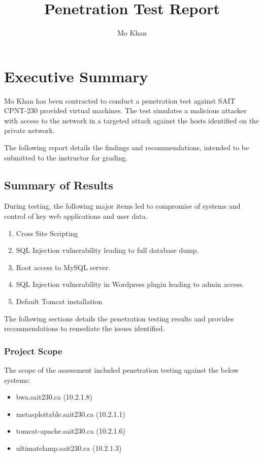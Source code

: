 \documentclass{article}
\title{Penetration Test Report}
\author{Mo Khan}
\begin{document}
\maketitle
\newpage
\tableofcontents
\newpage
{}

\section{Executive Summary}

Mo Khan has been contracted to conduct a penetration test against SAIT CPNT-230 provided
virtual machines. The test simulates a malicious attacker with access to the
network in a targeted attack against the hosts identified on the private network.

The following report details the findings and recommendations, intended to be submitted
to the instructor for grading.

\subsection{Summary of Results}

During testing, the following major items led to compromise of systems and control
of key web applications and user data.

\begin{enumerate}
  \item Cross Site Scripting
  \item SQL Injection vulnerability leading to full database dump.
  \item Root access to MySQL server.
  \item SQL Injection vulnerability in Wordpress plugin leading to admin access.
  \item Default Tomcat installation
\end{enumerate}

The following sections details the penetration testing results and provides 
recommendations to remediate the issues identified.

\subsubsection{Project Scope}

The scope of the assessment included penetration testing against the below systems:

\begin{itemize}
  \item bwa.sait230.ca (10.2.1.8)
  \item metasploitable.sait230.ca (10.2.1.1)
  \item tomcat-apache.sait230.ca (10.2.1.6)
  \item ultimatelamp.sait230.ca (10.2.1.3)
\end{itemize}
\end{document}
